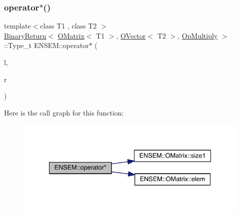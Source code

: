\subsubsection{\texorpdfstring{operator$\ast$()}{operator*()}\hspace{0.1cm}{\footnotesize\ttfamily [4/8]}}
{\footnotesize\ttfamily template$<$class T1 , class T2 $>$ \\
\mbox{\hyperlink{structENSEM_1_1BinaryReturn}{Binary\+Return}}$<$ \mbox{\hyperlink{classENSEM_1_1OMatrix}{O\+Matrix}}$<$ T1 $>$, \mbox{\hyperlink{classENSEM_1_1OVector}{O\+Vector}}$<$ T2 $>$, \mbox{\hyperlink{structENSEM_1_1OpMultiply}{Op\+Multiply}} $>$\+::Type\+\_\+t E\+N\+S\+E\+M\+::operator$\ast$ (\begin{DoxyParamCaption}\item[{const \mbox{\hyperlink{classENSEM_1_1OMatrix}{O\+Matrix}}$<$ T1 $>$ \&}]{l,  }\item[{const \mbox{\hyperlink{classENSEM_1_1OVector}{O\+Vector}}$<$ T2 $>$ \&}]{r }\end{DoxyParamCaption})\hspace{0.3cm}{\ttfamily [inline]}}

Here is the call graph for this function\+:\nopagebreak
\begin{figure}[H]
\begin{center}
\leavevmode
\includegraphics[width=335pt]{da/d59/group__obsvector_ga7ba413a9121973912be1ff1686cec922_cgraph}
\end{center}
\end{figure}
\mbox{\label{group__obsvector_gaae51a4414b6efe2f47cc4c62841aabf9}} 
